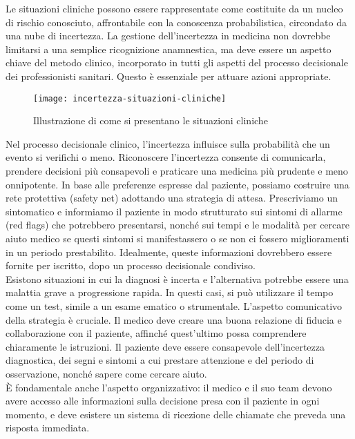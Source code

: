 Le situazioni cliniche possono essere rappresentate come costituite da un nucleo di rischio conosciuto, affrontabile con la conoscenza probabilistica, circondato da una nube di incertezza. La gestione dell'incertezza in medicina non dovrebbe limitarsi a una semplice ricognizione anamnestica, ma deve essere un aspetto chiave del metodo clinico, incorporato in tutti gli aspetti del processo decisionale dei professionisti sanitari. Questo è essenziale per attuare azioni appropriate.\\
\begin{figure}[!ht] 
    \centering 
    \texttt{[image: incertezza-situazioni-cliniche]} 
    \caption{Illustrazione di come si presentano le situazioni cliniche}
\end{figure}


Nel processo decisionale clinico, l'incertezza influisce sulla probabilità che un evento si verifichi o meno. Riconoscere l'incertezza consente di comunicarla, prendere decisioni più consapevoli e praticare una medicina più prudente e meno onnipotente.
In base alle preferenze espresse dal paziente, possiamo costruire una rete protettiva (safety net) adottando una strategia di attesa. Prescriviamo un sintomatico e informiamo il paziente in modo strutturato sui sintomi di allarme (red flags) che potrebbero presentarsi, nonché sui tempi e le modalità per cercare aiuto medico se questi sintomi si manifestassero o se non ci fossero miglioramenti in un periodo prestabilito. Idealmente, queste informazioni dovrebbero essere fornite per iscritto, dopo un processo decisionale condiviso.\\

Esistono situazioni in cui la diagnosi è incerta e l'alternativa potrebbe essere una malattia grave a progressione rapida. In questi casi, si può utilizzare il tempo come un test, simile a un esame ematico o strumentale. L'aspetto comunicativo della strategia è cruciale. Il medico deve creare una buona relazione di fiducia e collaborazione con il paziente, affinché quest'ultimo possa comprendere chiaramente le istruzioni. Il paziente deve essere consapevole dell'incertezza diagnostica, dei segni e sintomi a cui prestare attenzione e del periodo di osservazione, nonché sapere come cercare aiuto.\\

È fondamentale anche l'aspetto organizzativo: il medico e il suo team devono avere accesso alle informazioni sulla decisione presa con il paziente in ogni momento, e deve esistere un sistema di ricezione delle chiamate che preveda una risposta immediata.\\

